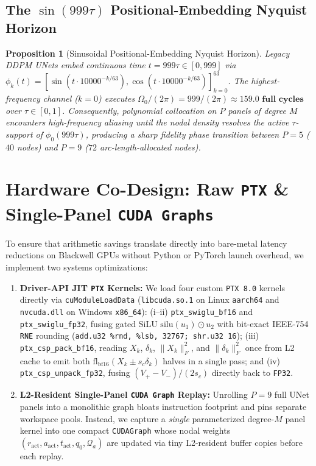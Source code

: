 \documentclass[11pt,a4paper]{article}
\newtheorem{proposition}{Proposition}
\theoremstyle{definition}
\theoremstyle{remark}
\newcommand{\fpthirtytwo}{\texttt{FP32}}
\begin{document}
\subsection{The $\sin(999\tau)$ Positional-Embedding Nyquist Horizon}
\begin{proposition}[Sinusoidal Positional-Embedding Nyquist Horizon]
\label{prop:nyquist}
Legacy DDPM UNets \citep{ho2020denoising} embed continuous time $t = 999\tau \in [0, 999]$ via $\phi_k(t) = [\sin(t \cdot 10000^{-k/63}), \cos(t \cdot 10000^{-k/63})]_{k=0}^{63}$. The highest-frequency channel ($k=0$) executes $\Omega_0 / (2\pi) = 999 / (2\pi) \approx \mathbf{159.0\text{ full cycles}}$ over $\tau \in [0, 1]$. Consequently, polynomial collocation on $P$ panels of degree $M$ encounters high-frequency aliasing until the nodal density resolves the active $\tau$-support of $\phi_0(999\tau)$, producing a sharp fidelity phase transition between $P=5$ ($40$ nodes) and $P=9$ ($72$ arc-length-allocated nodes).
\end{proposition}

\section{Hardware Co-Design: Raw \texttt{PTX} \& Single-Panel \texttt{CUDA Graphs}}
\label{sec:systems}
To ensure that arithmetic savings translate directly into bare-metal latency reductions on Blackwell GPUs without Python or PyTorch launch overhead, we implement two systems optimizations:
\begin{enumerate}[leftmargin=1.8em,itemsep=2pt]
    \item \textbf{Driver-API JIT \texttt{PTX} Kernels:} We load four custom \texttt{PTX~8.0} kernels directly via \texttt{cuModuleLoadData} (\texttt{libcuda.so.1} on Linux \texttt{aarch64} and \texttt{nvcuda.dll} on Windows \texttt{x86\_64}): (i--ii) \texttt{ptx\_swiglu\_bf16} and \texttt{ptx\_swiglu\_fp32}, fusing gated SiLU $\mathrm{silu}(u_1)\odot u_2$ with bit-exact IEEE-754 \texttt{RNE} rounding (\texttt{add.u32 \%rnd, \%lsb, 32767; shr.u32 16}); (iii) \texttt{ptx\_csp\_pack\_bf16}, reading $X_k$, $\delta_k$, $\|X_k\|_F^2$, and $\|\delta_k\|_F^2$ once from L2 cache to emit both $\mathrm{fl}_{\mathrm{bf16}}(X_k \pm s_c \delta_k)$ halves in a single pass; and (iv) \texttt{ptx\_csp\_unpack\_fp32}, fusing $(V_+ - V_-)/(2s_c)$ directly back to \fpthirtytwo{}.
    \item \textbf{L2-Resident Single-Panel \texttt{CUDA Graph} Replay:} Unrolling $P=9$ full UNet panels into a monolithic graph bloats instruction footprint and pins separate workspace pools. Instead, we capture a \emph{single} parameterized degree-$M$ panel kernel into one compact \texttt{CUDAGraph} whose nodal weights $(r_{\mathrm{act}}, a_{\mathrm{act}}, t_{\mathrm{act}}, q_0, \mathcal{Q}_a)$ are updated via tiny L2-resident buffer copies before each replay.
\end{enumerate}
\end{document}

